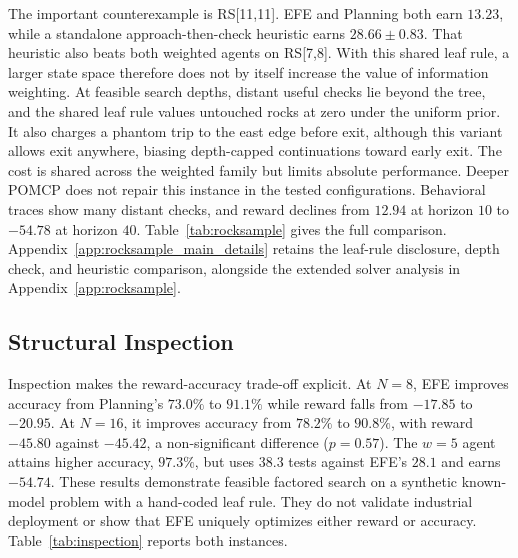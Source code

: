 \documentclass[runningheads]{llncs}
\begin{document}
The important counterexample is RS[11,11]. EFE and Planning both earn $13.23$, while a standalone approach-then-check heuristic earns $28.66\pm0.83$. That heuristic also beats both weighted agents on RS[7,8]. With this shared leaf rule, a larger state space therefore does not by itself increase the value of information weighting. At feasible search depths, distant useful checks lie beyond the tree, and the shared leaf rule values untouched rocks at zero under the uniform prior. It also charges a phantom trip to the east edge before exit, although this variant allows exit anywhere, biasing depth-capped continuations toward early exit. The cost is shared across the weighted family but limits absolute performance. Deeper POMCP does not repair this instance in the tested configurations. Behavioral traces show many distant checks, and reward declines from $12.94$ at horizon $10$ to $-54.78$ at horizon $40$. Table~\ref{tab:rocksample} gives the full comparison. Appendix~\ref{app:rocksample_main_details} retains the leaf-rule disclosure, depth check, and heuristic comparison, alongside the extended solver analysis in Appendix~\ref{app:rocksample}.

\subsection{Structural Inspection}
\label{sec:inspection}

Inspection makes the reward-accuracy trade-off explicit. At $N{=}8$, EFE improves accuracy from Planning's $73.0\%$ to $91.1\%$ while reward falls from $-17.85$ to $-20.95$. At $N{=}16$, it improves accuracy from $78.2\%$ to $90.8\%$, with reward $-45.80$ against $-45.42$, a non-significant difference ($p=0.57$). The $w{=}5$ agent attains higher accuracy, $97.3\%$, but uses $38.3$ tests against EFE's $28.1$ and earns $-54.74$. These results demonstrate feasible factored search on a synthetic known-model problem with a hand-coded leaf rule. They do not validate industrial deployment or show that EFE uniquely optimizes either reward or accuracy. Table~\ref{tab:inspection} reports both instances.
\end{document}
